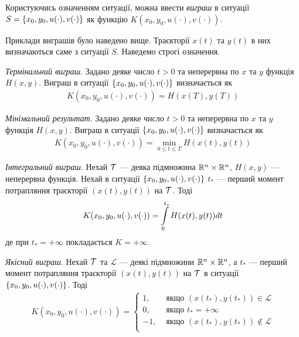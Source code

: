 \begin{definition}
    Користуючись означенням ситуації, можна ввести \emph{виграш} в ситуації $S = \left\{x_0, y_0, u(\cdot), v(\cdot) \right\}$
    як функцію $K(x_0, y_0, u(\cdot), v(\cdot))$.
\end{definition}
Приклади виграшів було наведено вище. Траєкторії $x(t)$ та $y(t)$ в них визначаються саме з ситуації $S$. Наведемо строгі означення.
\begin{definition}
        \emph{Термінальний виграш}. Задано деяке число $t>0$ та неперервна по $x$ та $y$ функція $H(x, y)$. Виграш в ситуації $\left\{x_0, y_0, u(\cdot), v(\cdot) \right\}$
        визначається як
        \begin{gather*}
            K(x_0, y_0, u(\cdot), v(\cdot)) = H(x(T), y(T))
        \end{gather*}
        
        \emph{Мінімальний результат}. Задано деяке число $t>0$ та неперервна по $x$ та $y$ функція $H(x, y)$. Виграш в ситуації $\left\{x_0, y_0, u(\cdot), v(\cdot) \right\}$
        визначається як
        \begin{gather*}
            K(x_0, y_0, u(\cdot), v(\cdot)) = \underset{0 \leq t \leq T}{\min} H(x(t), y(t))
        \end{gather*}
        
        \emph{Інтегральний виграш}. Нехай $\mathcal{T}$ --- деяка підмножина $\mathbb{R}^n \times \mathbb{R}^n$, $H(x, y)$ --- неперервна функція. Нехай в ситуації $\left\{x_0, y_0, u(\cdot), v(\cdot) \right\}$
        $t_*$ --- перший момент потрапляння траєкторії $(x(t), y(t))$ на $\mathcal{T}$.
        Тоді
        \begin{gather*}
            K(x_0, y_0, u(\cdot), v(\cdot)) = \int\limits_0^{t_*} H(x(t), y(t)) dt
        \end{gather*}
        де при $t_* = +\infty$ покладається $K = +\infty$.

        \emph{Якісний виграш}. Нехай $\mathcal{T}$ та $\mathcal{L}$ --- деякі підмножини $\mathbb{R}^n \times \mathbb{R}^n$, а $t_*$ --- перший момент потрапляння траєкторії $(x(t), y(t))$ на $\mathcal{T}$
        в ситуації $\left\{x_0, y_0, u(\cdot), v(\cdot) \right\}$. Тоді
        \begin{gather*}
            K(x_0, y_0, u(\cdot), v(\cdot)) = \begin{cases}
                1, & \text{ якщо } (x(t_*), y(t_*)) \in \mathcal{L} \\
                0, & \text{ якщо } t_* = +\infty \\
                -1, & \text{ якщо } (x(t_*), y(t_*)) \notin \mathcal{L} \\
            \end{cases}
        \end{gather*}
\end{definition}

